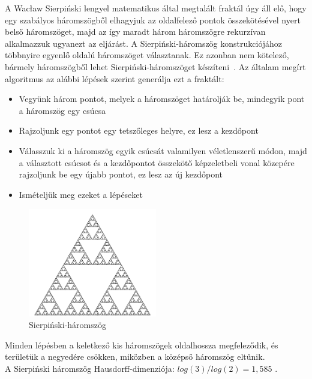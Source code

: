 A Wacław Sierpiński lengyel matematikus által megtalált fraktál úgy áll elő, hogy egy szabályos háromszögből elhagyjuk az oldalfelező pontok összekötésével nyert belső háromszöget, majd az így maradt három háromszögre rekurzívan alkalmazzuk ugyanezt az eljárást.
A Sierpiński-háromszög konstrukciójához többnyire egyenlő oldalú háromszöget választanak. Ez azonban nem kötelező, bármely háromszögből lehet Sierpiński-háromszöget készíteni~\cite{sierp-triangle}.
Az általam megírt algoritmus az alábbi lépések szerint generálja ezt a fraktált:
\begin{itemize}
\item Vegyünk három pontot, melyek a háromszöget határolják be, mindegyik pont a háromszög egy csúcsa
\item Rajzoljunk egy pontot egy tetszőleges helyre, ez lesz a kezdőpont
\item Válasszuk ki a háromszög egyik csúcsát valamilyen véletlenszerű módon, majd a választott csúcsot és a kezdőpontot összekötő képzeletbeli vonal közepére rajzoljunk be egy újabb pontot, ez lesz az új kezdőpont
\item Ismételjük meg ezeket a lépéseket
\end{itemize}
\begin{figure}[!ht]
\begin{center}
	\includegraphics[width=0.5\textwidth]{img/SierpinskiTriangle}
	\caption[labelInTOC]{Sierpiński-háromszög}
\end{center}
\end{figure}
Minden lépésben a keletkező kis háromszögek oldalhossza megfeleződik, és területük a negyedére csökken, miközben a középső háromszög eltűnik.\\
A Sierpiński háromszög Hausdorff-dimenziója: $log(3)/log(2) = 1,585$ \cite{sierp-triangle-wiki}.

